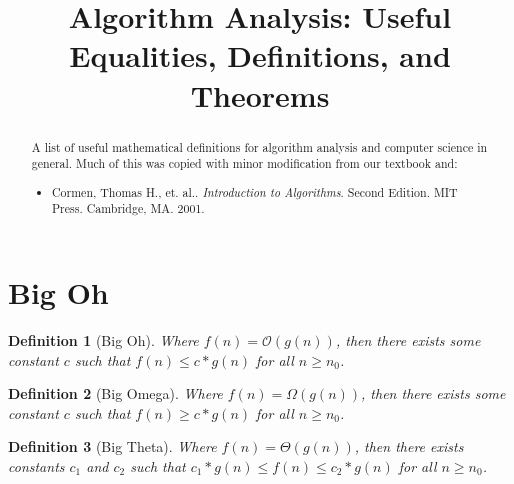 \documentclass[]{tufte-handout}
\title{Algorithm Analysis: Useful Equalities, Definitions, and Theorems}
\author{}
\date{}
\newtheorem{definition}{Definition}
\begin{document}
\maketitle

\begin{abstract}
A list of useful mathematical definitions for algorithm analysis and computer science in general. Much of this was copied with minor modification from our textbook and:
\begin{itemize}
\item Cormen, Thomas H., et. al.. \textit{Introduction to Algorithms}. Second Edition. MIT Press. Cambridge, MA. 2001.
\end{itemize}

\end{abstract}

\section{Big Oh}

\begin{definition}[Big Oh]
 \leavevmode\newline{}Where $f(n)=\mathcal{O}(g(n))$, then there exists some constant $c$ such that $f(n) \leq c*g(n)$ for all $n \geq n_0$.
\end{definition}
\vspace{.25in}

\begin{definition}[Big Omega]
\leavevmode\newline{}Where $f(n)=\Omega(g(n))$, then there exists some constant $c$ such that $f(n) \geq c*g(n)$ for all $n \geq n_0$.
\end{definition}
\vspace{.25in}

\begin{definition}[Big Theta]
\leavevmode\newline{}Where $f(n)=\Theta(g(n))$, then there exists constants $c_1$ and $c_2$ such that $ c_1*g(n) \leq f(n) \leq c_2*g(n)$ for all $n \geq n_0$.
\end{definition}
\vspace{1in}
\end{document}
